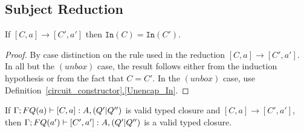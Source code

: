 \documentclass{article}
\begin{document}
\subsection{Subject Reduction}

\begin{lemma}
\label{Inwires}
If $[C,a]\to[C',a']$ then $\mathtt{In}(C)=\mathtt{In}(C')$.
\end{lemma}

\begin{proof}
By case distinction on the rule used in the reduction $[C,a]\to[C',a']$. 
In all but the $(unbox)$ case, the result follows either from the induction 
hypothesis or from the fact that $C=C'$. In the $(unbox)$ case, use 
Definition~\hyperref[Unencap_In]{\ref*{circuit_constructor}.\ref*{Unencap_In}}.
\end{proof}

\begin{proposition}
\label{subject_red_one_step}
If $\Gamma;FQ(a)\vdash [C,a]:A,(Q'|Q'')$ is valid typed closure 
and $[C,a]\to [C',a']$, then $\Gamma;FQ(a')\vdash [C',a']:A,(Q'|Q'')$ is 
a valid typed closure.
\end{proposition}
\end{document}
